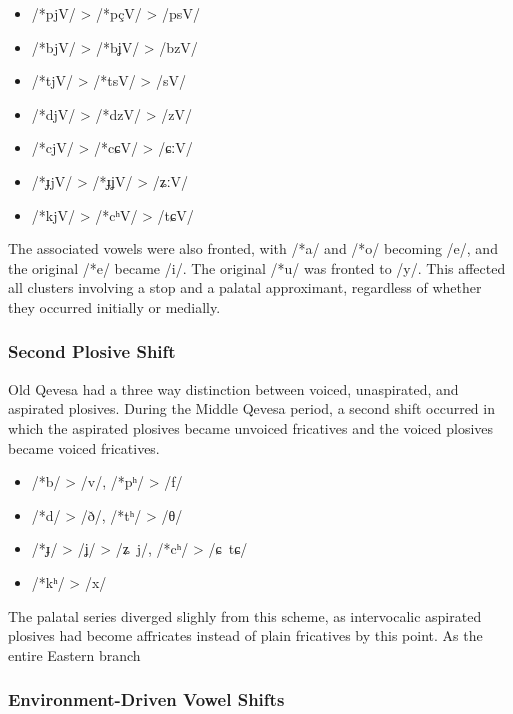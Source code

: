 \documentclass[grammar]{subfiles}
\begin{document}
\begin{itemize}
  \item /*pjV/ > /*pçV/ > /psV/
  \item /*bjV/ > /*bʝV/ > /bzV/
  \item /*tjV/ > /*tsV/ > /sV/
  \item /*djV/ > /*dzV/ > /zV/
  \item /*cjV/ > /*cɕV/ > /ɕːV/
  \item /*ɟjV/ > /*ɟʝV/ > /ʑːV/
  \item /*kjV/ > /*cʰV/ > /tɕV/
\end{itemize}

The associated vowels were also fronted, with /*a/ and /*o/ becoming /e/, and
the original /*e/ became /i/.  The original /*u/ was fronted to /y/.  This
affected all clusters involving a stop and a palatal approximant, regardless of
whether they occurred initially or medially.


\subsubsection{Second Plosive Shift}
\label{sssec:history:east:second_plosive_shift}

Old Qevesa had a three way distinction between voiced, unaspirated, and
aspirated plosives.  During the Middle Qevesa period, a second shift occurred
in which the aspirated plosives became unvoiced fricatives and the voiced
plosives became voiced fricatives.  

\begin{itemize}
  \item /*b/ > /v/, /*pʰ/ > /f/
  \item /*d/ > /ð/, /*tʰ/ > /θ/
  \item /*ɟ/ > /ʝ/ > /ʑ~j/, /*cʰ/ > /ɕ~tɕ/
  \item /*kʰ/ > /x/
\end{itemize}

The palatal series diverged slighly from this scheme, as intervocalic aspirated
plosives had become affricates instead of plain fricatives by this point.  As the entire Eastern branch 



\subsubsection{Environment-Driven Vowel Shifts}
\label{sssec:history:east:vowel_shifts}
\end{document}
